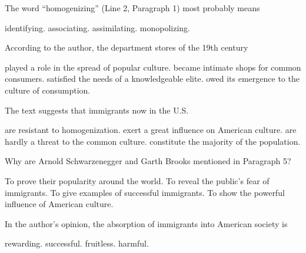 \item The word ``homogenizing'' (Line 2, Paragraph 1) most probably means
\begin{tasks}
	\task identifying.
	\task associating.
	\task assimilating.
	\task monopolizing.
\end{tasks}
\item According to the author, the department stores of the 19th century
\begin{tasks}
	\task played a role in the spread of popular culture.
	\task became intimate shops for common consumers.
	\task satisfied the needs of a knowledgeable elite.
	\task owed its emergence to the culture of consumption.
\end{tasks}
\item The text suggests that immigrants now in the U.S.
\begin{tasks}
	\task are resistant to homogenization.
	\task exert a great influence on American culture.
	\task are hardly a threat to the common culture.
	\task constitute the majority of the population.
\end{tasks}
\item Why are Arnold Schwarzenegger and Garth Brooks mentioned in Paragraph 5?
\begin{tasks}
	\task To prove their popularity around the world.
	\task To reveal the public's fear of immigrants.
	\task To give examples of successful immigrants.
	\task To show the powerful influence of American culture.
\end{tasks}
\item In the author's opinion, the absorption of immigrants into American society is
\begin{tasks}
	\task rewarding.
	\task successful.
	\task fruitless.
	\task harmful.
\end{tasks}